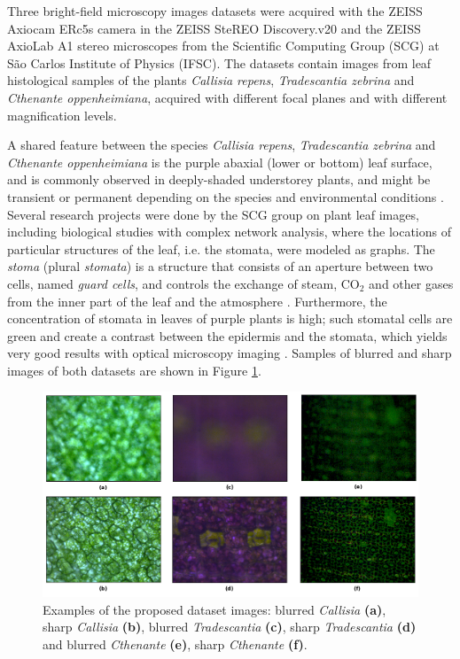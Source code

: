 Three bright-field microscopy images datasets were acquired with the ZEISS Axiocam ERc5s camera in the ZEISS SteREO Discovery.v20 and the ZEISS AxioLab A1 stereo microscopes from the Scientific Computing Group (SCG) at São Carlos Institute of Physics (IFSC). The datasets contain images from leaf histological samples of the plants \textit{Callisia repens}, \textit{Tradescantia zebrina} and \textit{Cthenante oppenheimiana}, acquired with different focal planes and with different magnification levels. 

A shared feature between the species \textit{Callisia repens}, \textit{Tradescantia zebrina} and \textit{Cthenante oppenheimiana} is the purple abaxial (lower or bottom) leaf surface, and is commonly observed in deeply-shaded understorey plants, and might be transient or permanent depending on the species and environmental conditions \cite{filho2018plants}. Several research projects were done by the SCG group on plant leaf images, including biological studies with complex network analysis, where the locations of particular structures of the leaf, i.e. the stomata, were modeled as graphs. The \emph{stoma} (plural \emph{stomata}) is a structure that consists of an aperture between two cells, named \emph{guard cells}, and controls the exchange of steam, CO$_{2}$ and other gases from the inner part of the leaf and the atmosphere  \cite{hetherington2003role}. Furthermore, the concentration of stomata in leaves of purple plants is high; such stomatal cells are green and create a contrast between the epidermis and the stomata, which yields very good results with optical microscopy imaging \cite{filho2018plants}. Samples of blurred and sharp images of both datasets are shown in Figure \ref{fig:datasets}.

\begin{figure}[ht]
	\centering
	\caption{Examples of the proposed dataset images: blurred \textit{Callisia} \textbf{(a)}, sharp \textit{Callisia} \textbf{(b)}, blurred \textit{Tradescantia} \textbf{(c)}, sharp \textit{Tradescantia} \textbf{(d)} and blurred \textit{Cthenante} \textbf{(e)}, sharp \textit{Cthenante} \textbf{(f)}.}
	\label{fig:datasets}
	\includegraphics[scale=0.4]{images/datasets.png}
	\centering
	\fautor
\end{figure}

